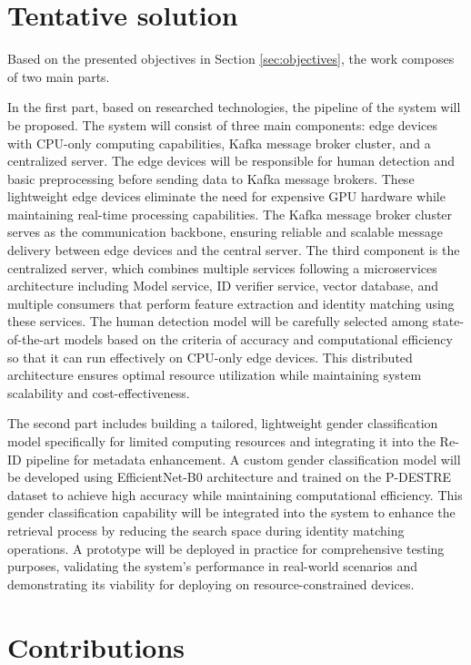 \documentclass[../main.tex]{subfiles}
\begin{document}
\section{Tentative solution} 
\label{sec:tentative_solution}

Based on the presented objectives in Section \ref{sec:objectives}, the work composes of two main parts.

In the first part, based on researched technologies, the pipeline of the system will be proposed. The system will consist of three main components: edge devices with CPU-only computing capabilities, Kafka message broker cluster, and a centralized server. The edge devices will be responsible for human detection and basic preprocessing before sending data to Kafka message brokers. These lightweight edge devices eliminate the need for expensive GPU hardware while maintaining real-time processing capabilities. The Kafka message broker cluster serves as the communication backbone, ensuring reliable and scalable message delivery between edge devices and the central server. The third component is the centralized server, which combines multiple services following a microservices architecture including Model service, ID verifier service, vector database, and multiple consumers that perform feature extraction and identity matching using these services. The human detection model will be carefully selected among state-of-the-art models based on the criteria of accuracy and computational efficiency so that it can run effectively on CPU-only edge devices. This distributed architecture ensures optimal resource utilization while maintaining system scalability and cost-effectiveness.

The second part includes building a tailored, lightweight gender classification model specifically for limited computing resources and integrating it into the Re-ID pipeline for metadata enhancement. A custom gender classification model will be developed using EfficientNet-B0 architecture and trained on the P-DESTRE dataset to achieve high accuracy while maintaining computational efficiency. This gender classification capability will be integrated into the system to enhance the retrieval process by reducing the search space during identity matching operations. A prototype will be deployed in practice for comprehensive testing purposes, validating the system's performance in real-world scenarios and demonstrating its viability for deploying on resource-constrained devices.


\section{Contributions}
\label{sec:contribution}
\end{document}
